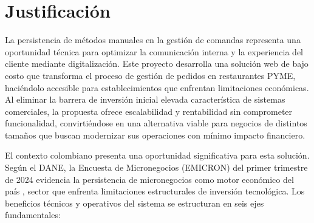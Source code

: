 \section{Justificación}

La persistencia de métodos manuales en la gestión de comandas representa una oportunidad técnica para optimizar la comunicación interna y la experiencia del cliente mediante digitalización. Este proyecto desarrolla una solución web de bajo costo que transforma el proceso de gestión de pedidos en restaurantes PYME, haciéndolo accesible para establecimientos que enfrentan limitaciones económicas. Al eliminar la barrera de inversión inicial elevada característica de sistemas comerciales, la propuesta ofrece escalabilidad y rentabilidad sin comprometer funcionalidad, convirtiéndose en una alternativa viable para negocios de distintos tamaños que buscan modernizar sus operaciones con mínimo impacto financiero.

El contexto colombiano presenta una oportunidad significativa para esta solución. Según el DANE, la Encuesta de Micronegocios (EMICRON) del primer trimestre de 2024 evidencia la persistencia de micronegocios como motor económico del país \cite{DANE2024}, sector que enfrenta limitaciones estructurales de inversión tecnológica. Los beneficios técnicos y operativos del sistema se estructuran en seis ejes fundamentales:

